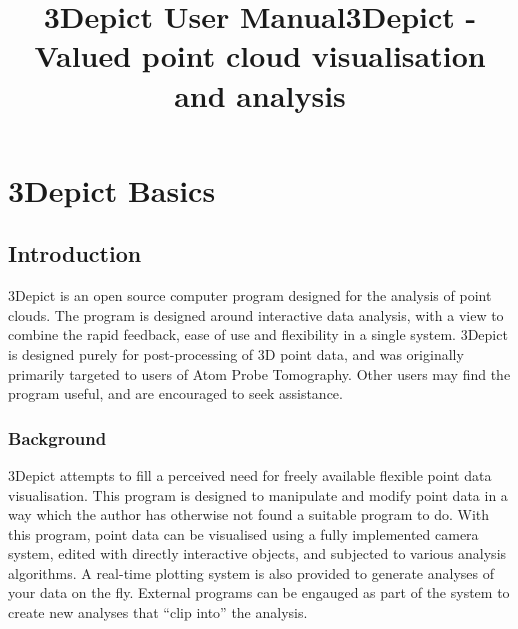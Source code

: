 \documentclass[10pt]{article}
\title{3Depict User Manual}
\begin{document}
\title{3Depict - Valued point cloud visualisation and analysis}

\section{3Depict Basics}
\subsection{Introduction}


  3Depict is an open source computer program designed for the analysis of point clouds. The program is designed around interactive data analysis, with a view to combine the rapid feedback, ease of use and flexibility in a single system.  
 3Depict is designed purely for post-processing of 3D point data, and was originally primarily targeted to users of Atom Probe Tomography. Other users may find the program useful, and are encouraged to seek assistance. 
 
\subsubsection{Background}


  3Depict attempts to fill a perceived need for freely available flexible point data visualisation. This program is designed to manipulate and modify point data in a way which the author has otherwise not found a suitable program to do.  
 With this program, point data can be visualised using a fully implemented camera system, edited with directly interactive objects, and subjected to various analysis algorithms. A real-time plotting system is also provided to generate analyses of your data on the fly. External programs can be engauged as part of the system to create new analyses that ``clip into'' the analysis. 
 
\end{document}
